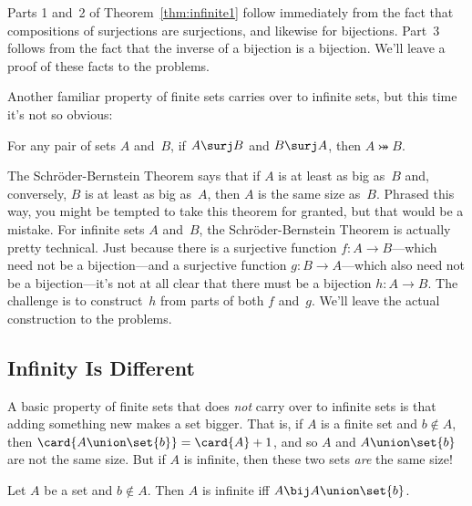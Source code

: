 Parts 1 and~2 of Theorem~\ref{thm:infinite1} follow immediately from
the fact that compositions of surjections are surjections, and
likewise for bijections.  Part~3 follows from the fact that the
inverse of a bijection is a bijection.  We'll leave a proof of these
facts to the problems.

Another familiar property of finite sets carries over to infinite
sets, but this time it's not so obvious:

\begin{theorem}\label{schroder-bernstein}
For any pair of sets $A$ and~$B$, if $A \surj B$ and $B \surj A$, then
$A \bij B$.
\end{theorem}

The Schr\"oder-Bernstein Theorem says that if $A$ is at least as big
as~$B$ and, conversely, $B$ is at least as big as~$A$, then $A$ is the
same size as~$B$.  Phrased this way, you might be tempted to take this
theorem for granted, but that would be a mistake.  For infinite sets
$A$ and~$B$, the Schr\"oder-Bernstein Theorem is actually pretty
technical.  Just because there is a surjective function $f: A \to
B$---which need not be a bijection---and a surjective function $g: B
\to A$---which also need not be a bijection---it's not at all clear
that there must be a bijection $h: A \to B$.  The challenge is to
construct~$h$ from parts of both $f$ and~$g$.  We'll leave the actual
construction to the problems.

\subsection{Infinity Is Different}

A basic property of finite sets that does \emph{not} carry over to
infinite sets is that adding something new makes a set bigger.  That
is, if $A$ is a finite set and $b \notin A$, then $\card{A \union
  \set{b}} = \card{A} + 1$, and so $A$ and $A \union \set{b}$ are not
the same size.  But if $A$ is infinite, then these two sets \emph{are}
the same size!

\begin{theorem}\label{thm:infinite2}
Let $A$ be a set and $b \notin A$.  Then $A$ is infinite iff $A \bij A
\union \set{b}$.
\end{theorem}

